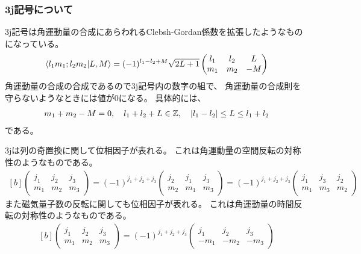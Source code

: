 \documentclass[../ap_2011.tex]{subfiles}
\begin{document}
\subsubsection*{3j記号について}
3j記号は角運動量の合成にあらわれるClebsh-Gordan係数を拡張したようなものになっている。
\begin{equation}\begin{aligned}[b]
    \bra{l_1m_1;l_2m_2}\ket{L,M}=(-1)^{l_1-l_2+M}\sqrt{2L+1}\begin{pmatrix}
        l_1 &l_2&L\\
        m_1 &m_2&-M
    \end{pmatrix}
\end{aligned}\end{equation}
角運動量の合成の合成であるので3j記号内の数字の組で、
角運動量の合成則を守らないようなときには値が0になる。
具体的には、
\begin{equation}\begin{aligned}[b]
    m_1+m_2-M=0,\quad l_1+l_2+L \in \mathbb{Z},\quad \abs{l_1-l_2}\leq L \leq l_1+l_2
\end{aligned}\end{equation}
である。

3jは列の奇置換に関して位相因子が表れる。
これは角運動量の空間反転の対称性のようなものである。
\begin{equation}\begin{aligned}[b]
    \begin{pmatrix}
        j_1 & j_2 & j_3\\
        m_1 & m_2 & m_3
    \end{pmatrix}
    =(-1)^{j_1+j_2+j_3}\begin{pmatrix}
        j_2 & j_1 & j_3\\
        m_2 & m_1 & m_3
    \end{pmatrix}=(-1)^{j_1+j_2+j_3}\begin{pmatrix}
        j_1 & j_3 & j_2\\
        m_1 & m_3 & m_2
    \end{pmatrix}
\end{aligned}\end{equation}
また磁気量子数の反転に関しても位相因子が表れる。
これは角運動量の時間反転の対称性のようなものである。
\begin{equation}\begin{aligned}[b]
    \begin{pmatrix}
        j_1 & j_2 & j_3\\
        m_1 & m_2 & m_3
    \end{pmatrix}
    =(-1)^{j_1+j_2+j_3}\begin{pmatrix}
        j_1 & j_2 & j_3\\
        -m_1 & -m_2 & -m_3
    \end{pmatrix}
\end{aligned}\end{equation}
\end{document}
